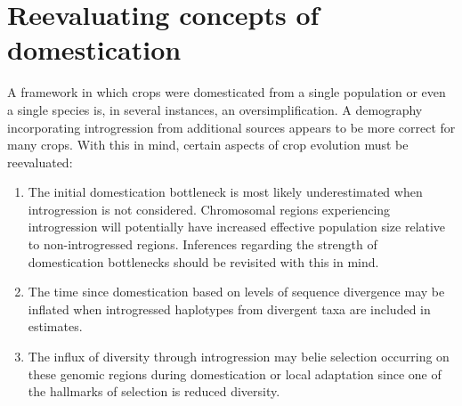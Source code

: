 \documentclass[11pt]{article}
\begin{document}


\section*{Reevaluating concepts of domestication}
A framework in which crops were domesticated from a single population or even a single species is, in several instances, an oversimplification. A demography incorporating introgression from additional sources appears to be more correct for many crops. With this in mind, certain aspects of crop evolution must be reevaluated:
\begin{enumerate}
	\item{The initial domestication bottleneck is most likely underestimated when introgression is not considered. Chromosomal regions experiencing introgression will potentially have increased effective population size relative to non-introgressed regions. Inferences regarding the strength of domestication bottlenecks should be revisited with this in mind.}
	\item{The time since domestication based on levels of sequence divergence may be inflated when introgressed haplotypes from divergent taxa are included in estimates.}
	\item{The influx of diversity through introgression may belie selection occurring on these genomic regions during domestication or local adaptation since one of the hallmarks of selection is reduced diversity.}
\end{enumerate}
\end{document}
